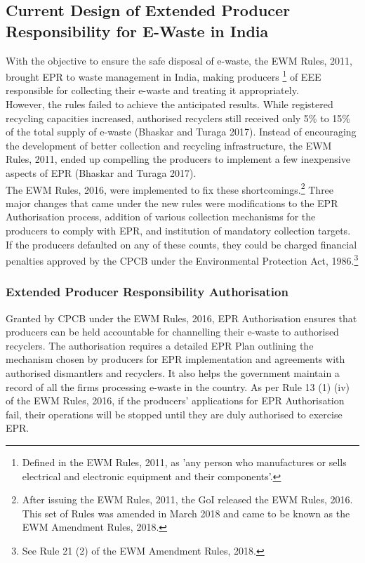 \documentclass[a4paper, 12pt]{article}
\begin{document}
                    \subsection{Current Design of Extended Producer Responsibility for E-Waste in India}
                    
                    With the objective to ensure the safe disposal of e-waste, the EWM Rules, 2011, brought EPR to waste management in India, making producers \footnote{Defined in the EWM Rules, 2011, as 'any person who manufactures or sells electrical and electronic equipment and their components'.} of EEE responsible for collecting their e-waste and treating it appropriately. \\
                    
                    However, the rules failed to achieve the anticipated results. While registered recycling capacities increased, authorised recyclers still received only 5\% to 15\% of the total supply of e-waste (Bhaskar and Turaga 2017). Instead of encouraging the development of better collection and recycling infrastructure, the EWM Rules, 2011, ended up compelling the producers to implement a few inexpensive aspects of EPR (Bhaskar and Turaga 2017). \\
                    
                    The EWM Rules, 2016, were implemented to fix these shortcomings.\footnote{ After issuing the EWM Rules, 2011, the GoI released the EWM Rules, 2016. This set of Rules was amended in March 2018 and came to be known as the EWM Amendment Rules, 2018.} Three major changes that came under the new rules were modifications to the EPR Authorisation process, addition of various collection mechanisms for the producers to comply with EPR, and institution of mandatory collection targets. If the producers defaulted on any of these counts, they could be charged financial penalties approved by the CPCB under the Environmental Protection Act, 1986.\footnote{See Rule 21 (2) of the EWM Amendment Rules, 2018.} \\
                    
                    \subsubsection{Extended Producer Responsibility Authorisation}
                    
                    Granted by CPCB under the EWM Rules, 2016, EPR Authorisation ensures that producers can be held accountable for channelling their e-waste to authorised recyclers. The authorisation requires a detailed EPR Plan outlining the mechanism chosen by producers for EPR implementation and agreements with authorised dismantlers and recyclers. It also helps the government maintain a record of all the firms processing e-waste in the country. As per Rule 13 (1) (iv) of the EWM Rules, 2016, if the producers’ applications for EPR Authorisation fail, their operations will be stopped until they are duly authorised to exercise EPR. \\
                                         
\end{document}
